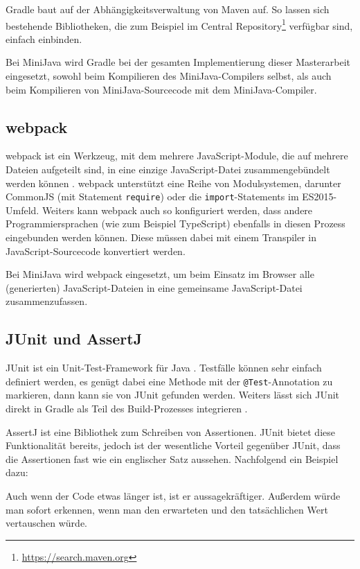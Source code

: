 Gradle baut auf der Abhängigkeitsverwaltung von Maven auf. So lassen sich bestehende Bibliotheken, die zum Beispiel im Central Repository\footnote{\url{https://search.maven.org}} verfügbar sind, einfach einbinden.

Bei MiniJava wird Gradle bei der gesamten Implementierung dieser Masterarbeit eingesetzt, sowohl beim Kompilieren des MiniJava-Compilers selbst, als auch beim Kompilieren von MiniJava-Sourcecode mit dem MiniJava-Compiler.

\subsection{webpack}
webpack ist ein Werkzeug, mit dem mehrere JavaScript-Module, die auf mehrere Dateien aufgeteilt sind, in eine einzige JavaScript-Datei zusammengebündelt werden können \cite{Webpack}. webpack unterstützt eine Reihe von Modulsystemen, darunter CommonJS (mit Statement \lstinline{require}) oder die \lstinline{import}-Statements im ES2015-Umfeld. Weiters kann webpack auch so konfiguriert werden, dass andere Programmiersprachen (wie zum Beispiel TypeScript) ebenfalls in diesen Prozess eingebunden werden können. Diese müssen dabei mit einem Transpiler in JavaScript-Sourcecode konvertiert werden.

Bei MiniJava wird webpack eingesetzt, um beim Einsatz im Browser alle (generierten) JavaScript-Dateien in eine gemeinsame JavaScript-Datei zusammenzufassen.

\subsection{JUnit und AssertJ}
JUnit ist ein Unit-Test-Framework für Java \cite{JUnit}. Testfälle können sehr einfach definiert werden, es genügt dabei eine Methode mit der \lstinline{@Test}-Annotation zu markieren, dann kann sie von JUnit gefunden werden. Weiters lässt sich JUnit direkt in Gradle als Teil des Build-Prozesses integrieren \cite{Gradle}.

AssertJ ist eine Bibliothek zum Schreiben von Assertionen. JUnit bietet diese Funktionalität bereits, jedoch ist der wesentliche Vorteil gegenüber JUnit, dass die Assertionen fast wie ein englischer Satz aussehen. Nachfolgend ein Beispiel dazu:



Auch wenn der Code etwas länger ist, ist er aussagekräftiger. Außerdem würde man sofort erkennen, wenn man den erwarteten und den tatsächlichen Wert vertauschen würde.

